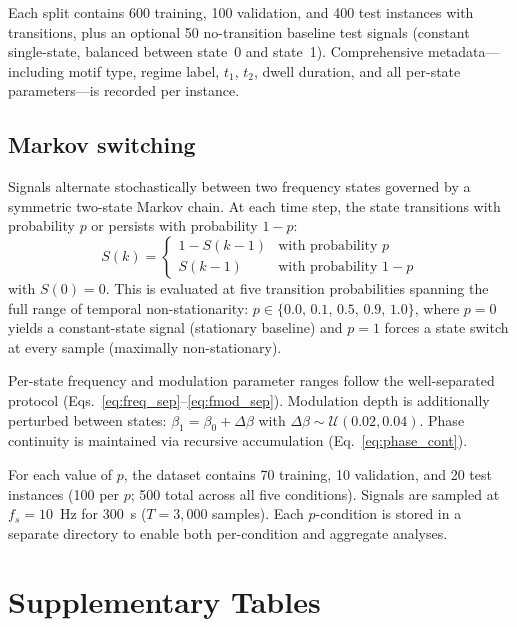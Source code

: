 \documentclass[11pt]{article}
\begin{document}
Each split contains 600 training, 100 validation, and 400 test instances with transitions, plus an optional 50 no-transition baseline test signals (constant single-state, balanced between state~0 and state~1). Comprehensive metadata---including motif type, regime label, $t_1$, $t_2$, dwell duration, and all per-state parameters---is recorded per instance.

\subsection{Markov switching}
\label{sec:markov}

Signals alternate stochastically between two frequency states governed by a symmetric two-state Markov chain. At each time step, the state transitions with probability $p$ or persists with probability $1 - p$:
\begin{equation}
    S(k) =
    \begin{cases}
        1 - S(k-1) & \text{with probability } p \\
        S(k-1)     & \text{with probability } 1 - p
    \end{cases}
    \label{eq:markov}
\end{equation}
with $S(0) = 0$. This is evaluated at five transition probabilities spanning the full range of temporal non-stationarity: $p \in \{0.0,\, 0.1,\, 0.5,\, 0.9,\, 1.0\}$, where $p = 0$ yields a constant-state signal (stationary baseline) and $p = 1$ forces a state switch at every sample (maximally non-stationary).

Per-state frequency and modulation parameter ranges follow the well-separated protocol (Eqs.~\eqref{eq:freq_sep}--\eqref{eq:fmod_sep}). Modulation depth is additionally perturbed between states: $\beta_1 = \beta_0 + \Delta\beta$ with $\Delta\beta \sim \mathcal{U}(0.02, 0.04)$. Phase continuity is maintained via recursive accumulation (Eq.~\eqref{eq:phase_cont}).

For each value of $p$, the dataset contains 70 training, 10 validation, and 20 test instances (100 per $p$; 500 total across all five conditions). Signals are sampled at $f_s = 10$~Hz for 300~s ($T = 3{,}000$ samples). Each $p$-condition is stored in a separate directory to enable both per-condition and aggregate analyses.

\section*{Supplementary Tables}
\end{document}
